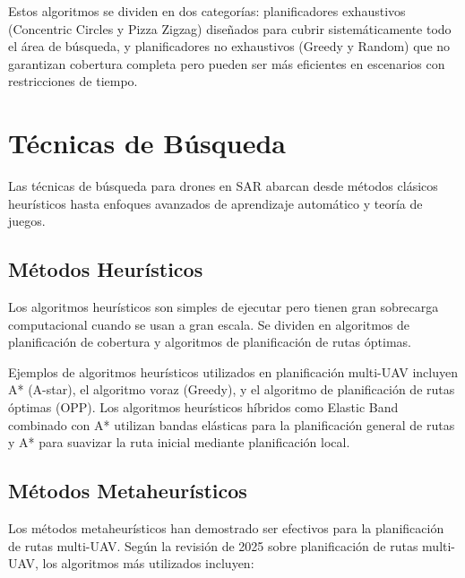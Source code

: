 \documentclass[12pt]{report} %
\begin{document}
Estos algoritmos se dividen en dos categorías: planificadores exhaustivos (Concentric Circles y Pizza Zigzag) diseñados para cubrir sistemáticamente todo el área de búsqueda, y planificadores no exhaustivos (Greedy y Random) que no garantizan cobertura completa pero pueden ser más eficientes en escenarios con restricciones de tiempo.

\chapter{Técnicas de Búsqueda}

Las técnicas de búsqueda para drones en SAR abarcan desde métodos clásicos heurísticos hasta enfoques avanzados de aprendizaje automático y teoría de juegos.

\section{Métodos Heurísticos}

Los algoritmos heurísticos son simples de ejecutar pero tienen gran sobrecarga computacional cuando se usan a gran escala. Se dividen en algoritmos de planificación de cobertura y algoritmos de planificación de rutas óptimas\cite{tan2021}.

Ejemplos de algoritmos heurísticos utilizados en planificación multi-UAV incluyen A* (A-star), el algoritmo voraz (Greedy), y el algoritmo de planificación de rutas óptimas (OPP). Los algoritmos heurísticos híbridos como Elastic Band combinado con A* utilizan bandas elásticas para la planificación general de rutas y A* para suavizar la ruta inicial mediante planificación local.

\section{Métodos Metaheurísticos}

Los métodos metaheurísticos han demostrado ser efectivos para la planificación de rutas multi-UAV. Según la revisión de 2025 sobre planificación de rutas multi-UAV\cite{alqudsi2025, guo2025}, los algoritmos más utilizados incluyen:
\end{document}
